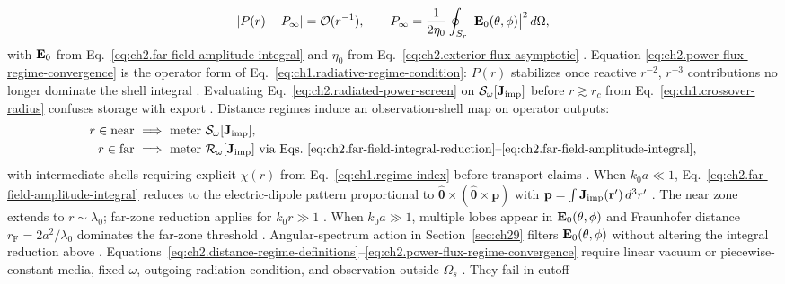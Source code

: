 \begin{equation}
\label{eq:ch2.power-flux-regime-convergence}
|P(r)-P_\infty|
=
\mathcal{O}(r^{-1}),
\qquad
P_\infty
=
\frac{1}{2\eta_0}\oint_{S_r}
\big|\mathbf{E}_0(\theta,\phi)\big|^{2}\,d\Omega,
\end{equation} with \(\mathbf{E}_0\) from Eq.~\eqref{eq:ch2.far-field-amplitude-integral} and \(\eta_0\) from
Eq.~\eqref{eq:ch2.exterior-flux-asymptotic} \cite{stratton1941}. Equation
\eqref{eq:ch2.power-flux-regime-convergence} is the operator form of
Eq.~\eqref{eq:ch1.radiative-regime-condition}: \(P(r)\) stabilizes once reactive
\(r^{-2}\), \(r^{-3}\) contributions no longer dominate the shell integral
\cite{stratton1941}. Evaluating Eq.~\eqref{eq:ch2.radiated-power-screen} on
\(\mathcal{S}_\omega[\mathbf{J}_{\mathrm{imp}}]\) before \(r\gtrsim r_c\) from
Eq.~\eqref{eq:ch1.crossover-radius} confuses storage with export
\cite{harrington2001}.
Distance regimes induce an observation-shell map on operator outputs:
\begin{equation}
\label{eq:ch2.observation-shell-regime-map}
\begin{aligned}
r\in\text{near}
&\ \Longrightarrow\
\text{meter}\ \mathcal{S}_\omega[\mathbf{J}_{\mathrm{imp}}],\\
r\in\text{far}
&\ \Longrightarrow\
\text{meter}\ \mathcal{R}_\omega[\mathbf{J}_{\mathrm{imp}}]\ \text{via Eqs.~\eqref{eq:ch2.far-field-integral-reduction}--\eqref{eq:ch2.far-field-amplitude-integral}},
\end{aligned}
\end{equation}
with intermediate shells requiring explicit \(\chi(r)\) from
Eq.~\eqref{eq:ch1.regime-index} before transport claims \cite{stratton1941}.
When \(k_0 a\ll 1\), Eq.~\eqref{eq:ch2.far-field-amplitude-integral} reduces to the
electric-dipole pattern proportional to
\(\widehat{\boldsymbol{\theta}}\times(\widehat{\boldsymbol{\theta}}\times\mathbf{p})\)
with \(\mathbf{p}=\int \mathbf{J}_{\mathrm{imp}}(\mathbf{r}')\,d^{3}r'\) \cite{jackson1999}. The
near zone extends to \(r\sim\lambda_0\); far-zone reduction applies for
\(k_0 r\gg 1\) \cite{harrington2001}. When \(k_0 a\gg 1\), multiple lobes appear in
\(\mathbf{E}_0(\theta,\phi)\) and Fraunhofer distance \(r_{\mathrm{F}}=2a^{2}/\lambda_0\) dominates
the far-zone threshold \cite{stratton1941}. Angular-spectrum action in
Section~\ref{sec:ch29} filters $\mathbf{E}_0(\theta,\phi)$ without altering the integral
reduction above \cite{stratton1941}.
Equations~\eqref{eq:ch2.distance-regime-definitions}--\eqref{eq:ch2.power-flux-regime-convergence}
require linear vacuum or piecewise-constant media, fixed \(\omega\), outgoing radiation
condition, and observation outside \(\Omega_s\) \cite{stratton1941}. They fail in cutoff
